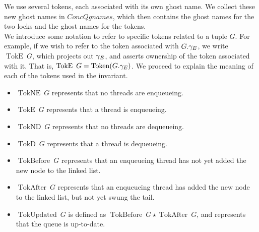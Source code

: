 \documentclass[a4paper, 10pt]{report}
\theoremstyle{definition}
\newcommand{\ConcQgnames}{ConcQgnames}
\newcommand{\Qg}{G}
\newcommand{\Token}[1]{\operatorname{Token}(#1)}
\newcommand{\TokE}[1]{\operatorname{TokE} ~ #1}
\newcommand{\TokEQg}{\TokE{\Qg}}
\newcommand{\TokNE}[1]{\operatorname{TokNE} ~ #1}
\newcommand{\TokNEQg}{\TokNE{\Qg}}
\newcommand{\TokD}[1]{\operatorname{TokD} ~ #1}
\newcommand{\TokDQg}{\TokD{\Qg}}
\newcommand{\TokND}[1]{\operatorname{TokND} ~ #1}
\newcommand{\TokNDQg}{\TokND{\Qg}}
\newcommand{\TokBefore}[1]{\operatorname{TokBefore} ~ #1}
\newcommand{\TokBeforeQg}{\TokBefore{\Qg}}
\newcommand{\TokAfter}[1]{\operatorname{TokAfter} ~ #1}
\newcommand{\TokAfterQg}{\TokAfter{\Qg}}
\newcommand{\TokUpdated}[1]{\operatorname{TokUpdated} ~ #1}
\newcommand{\TokUpdatedQg}{\TokUpdated{\Qg}}
\begin{document}
We use several tokens, each associated with its own ghost name. We collect these new ghost names in $\ConcQgnames$, which then contains the ghost names for the two locks and the ghost names for the tokens.\\
We introduce some notation to refer to specific tokens related to a tuple $\Qg$. For example, if we wish to refer to the token associated with $\Qg.\gname_E$, we write $\TokEQg$, which projects out $\gamma_E$, and asserts ownership of the token associated with it. That is, $\TokEQg = \Token{\Qg.\gname_E}$. We proceed to explain the meaning of each of the tokens used in the invariant.
\begin{itemize}
  \item $\TokNEQg$ represents that no threads are enqueueing.
  \item $\TokEQg$ represents that a thread is enqueueing.
  \item $\TokNDQg$ represents that no threads are dequeueing.
  \item $\TokDQg$ represents that a thread is dequeueing.
  \item $\TokBeforeQg$ represents that an enqueueing thread has not yet added the new node to the linked list.
  \item $\TokAfterQg$ represents that an enqueueing thread has added the new node to the linked list, but not yet swung the tail.
  \item $\TokUpdatedQg$ is defined as $\TokBeforeQg \star{} \TokAfterQg$, and represents that the queue is up-to-date.
\end{itemize}
\end{document}
